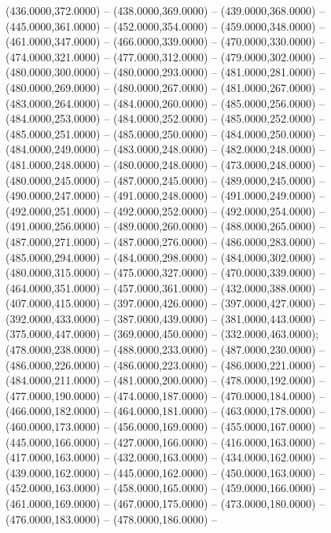 \begin{scope}[shift={(-231.87,-121.87)}]
\begin{scope}[draw=black,fill=c2b83ba,line join=round,line width=0.208pt]
        (436.0000,372.0000) -- (438.0000,369.0000) -- (439.0000,368.0000) --
        (445.0000,361.0000) -- (452.0000,354.0000) -- (459.0000,348.0000) --
        (461.0000,347.0000) -- (466.0000,339.0000) -- (470.0000,330.0000) --
        (474.0000,321.0000) -- (477.0000,312.0000) -- (479.0000,302.0000) --
        (480.0000,300.0000) -- (480.0000,293.0000) -- (481.0000,281.0000) --
        (480.0000,269.0000) -- (480.0000,267.0000) -- (481.0000,267.0000) --
        (483.0000,264.0000) -- (484.0000,260.0000) -- (485.0000,256.0000) --
        (484.0000,253.0000) -- (484.0000,252.0000) -- (485.0000,252.0000) --
        (485.0000,251.0000) -- (485.0000,250.0000) -- (484.0000,250.0000) --
        (484.0000,249.0000) -- (483.0000,248.0000) -- (482.0000,248.0000) --
        (481.0000,248.0000) -- (480.0000,248.0000) -- (473.0000,248.0000) --
        (480.0000,245.0000) -- (487.0000,245.0000) -- (489.0000,245.0000) --
        (490.0000,247.0000) -- (491.0000,248.0000) -- (491.0000,249.0000) --
        (492.0000,251.0000) -- (492.0000,252.0000) -- (492.0000,254.0000) --
        (491.0000,256.0000) -- (489.0000,260.0000) -- (488.0000,265.0000) --
        (487.0000,271.0000) -- (487.0000,276.0000) -- (486.0000,283.0000) --
        (485.0000,294.0000) -- (484.0000,298.0000) -- (484.0000,302.0000) --
        (480.0000,315.0000) -- (475.0000,327.0000) -- (470.0000,339.0000) --
        (464.0000,351.0000) -- (457.0000,361.0000) -- (432.0000,388.0000) --
        (407.0000,415.0000) -- (397.0000,426.0000) -- (397.0000,427.0000) --
        (392.0000,433.0000) -- (387.0000,439.0000) -- (381.0000,443.0000) --
        (375.0000,447.0000) -- (369.0000,450.0000) -- (332.0000,463.0000);
       (478.0000,238.0000) -- (488.0000,233.0000) --
        (487.0000,230.0000) -- (486.0000,226.0000) -- (486.0000,223.0000) --
        (486.0000,221.0000) -- (484.0000,211.0000) -- (481.0000,200.0000) --
        (478.0000,192.0000) -- (477.0000,190.0000) -- (474.0000,187.0000) --
        (470.0000,184.0000) -- (466.0000,182.0000) -- (464.0000,181.0000) --
        (463.0000,178.0000) -- (460.0000,173.0000) -- (456.0000,169.0000) --
        (455.0000,167.0000) -- (445.0000,166.0000) -- (427.0000,166.0000) --
        (416.0000,163.0000) -- (417.0000,163.0000) -- (432.0000,163.0000) --
        (434.0000,162.0000) -- (439.0000,162.0000) -- (445.0000,162.0000) --
        (450.0000,163.0000) -- (452.0000,163.0000) -- (458.0000,165.0000) --
        (459.0000,166.0000) -- (461.0000,169.0000) -- (467.0000,175.0000) --
        (473.0000,180.0000) -- (476.0000,183.0000) -- (478.0000,186.0000) --

\end{scope}
\end{scope}
